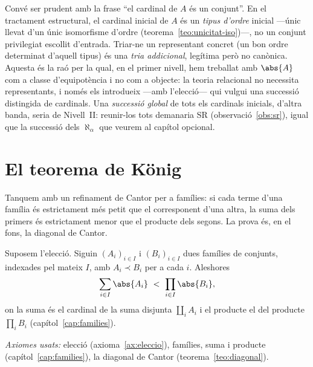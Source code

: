 \begin{observacio}\label{obs:cardinal-prudencia}
Convé ser prudent amb la frase \enquote{el cardinal de \(A\) és un conjunt}.
En el tractament estructural, el cardinal inicial de \(A\) és un \emph{tipus
d'ordre} inicial ---únic llevat d'un únic isomorfisme d'ordre
(teorema~\ref{teo:unicitat-iso})---, no un conjunt privilegiat escollit
d'entrada. Triar-ne un representant concret (un bon ordre determinat d'aquell
tipus) és una \emph{tria addicional}, legítima però no canònica. Aquesta és la
raó per la qual, en el primer nivell, hem treballat amb \(\abs{A}\) com a
classe d'equipotència i no com a objecte: la teoria relacional no necessita
representants, i només els introdueix ---amb l'elecció--- qui vulgui una
successió distingida de cardinals. Una \emph{successió global} de tots els
cardinals inicials, d'altra banda, seria de Nivell~II: reunir-los tots
demanaria SR (observació~\ref{obs:sr}), igual que la successió dels
\(\aleph_\alpha\) que veurem al capítol opcional.
\end{observacio}

\section{El teorema de König}\label{sec:konig}

Tanquem amb un refinament de Cantor per a famílies: si cada terme d'una
família és estrictament més petit que el corresponent d'una altra, la suma
dels primers és estrictament menor que el producte dels segons. La prova és,
en el fons, la diagonal de Cantor.

\begin{teorema}[König]\label{teo:konig}
Suposem l'elecció. Siguin \((A_i)_{i\in I}\) i \((B_i)_{i\in I}\) dues famílies
de conjunts, indexades pel mateix \(I\), amb \(A_i\prec B_i\) per a cada \(i\).
Aleshores
\[
\sum_{i\in I}\abs{A_i}\ <\ \prod_{i\in I}\abs{B_i},
\]
on la suma és el cardinal de la suma disjunta \(\coprod_i A_i\) i el producte
el del producte \(\prod_i B_i\) (capítol~\ref{cap:families}).\par
\emph{Axiomes usats:} elecció (axioma~\ref{ax:eleccio}), famílies, suma i
producte (capítol~\ref{cap:families}), la diagonal de Cantor
(teorema~\ref{teo:diagonal}).
\end{teorema}

